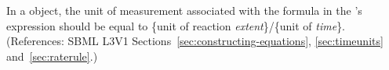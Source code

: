In a \KineticLaw object, the unit of measurement associated with the
formula in the \KineticLaw's  expression should be equal to
\{unit of reaction \emph{extent}\}/\{unit of \emph{time}\}.  (References:
SBML L3V1 Sections~\ref{sec:constructing-equations}, \ref{sec:timeunits}
and~\ref{sec:raterule}.)
